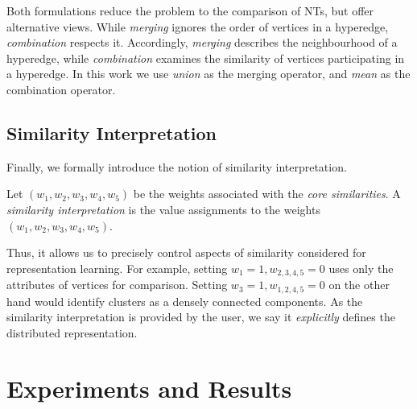 Both formulations reduce the problem to the comparison of NTs, but offer alternative views.
While \textit{merging} ignores the order of vertices in a hyperedge, \textit{combination} respects it.
Accordingly, \textit{merging} describes the neighbourhood of a hyperedge, while \textit{combination} examines the similarity of vertices participating in a hyperedge.
In this work we use \textit{union} as the merging operator, and \textit{mean} as the combination operator.



\subsection{Similarity Interpretation}

Finally, we formally introduce the notion of similarity interpretation.

\begin{definition}
Let $(w_1,w_2,w_3,w_4,w_5)$ be the weights associated with the \textit{core similarities}.
A \textit{similarity interpretation} is the value assignments to the weights $(w_1,w_2,w_3,w_4,w_5)$. 
\end{definition}

Thus, it allows us to precisely control aspects of similarity considered for representation learning.
For example, setting $w_1 = 1, w_{2,3,4,5} = 0$ uses only the attributes of vertices for comparison.
Setting $w_3 = 1, w_{1,2,4,5} = 0$ on the other hand would identify clusters as a densely connected components. 
As the similarity interpretation is provided by the user, we say it \textit{explicitly} defines the distributed representation.



\section{Experiments and Results}
\label{sec:Results}

